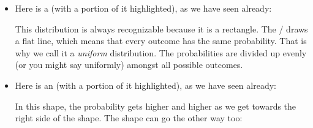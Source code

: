 \documentclass[../../../main.tex]{subfiles}
\begin{document}
\begin{itemize}

  \item Here is a  (with a portion of it highlighted), as we have seen already:
  
    \begin{center}
    \end{center}
    
    This distribution is always recognizable because it is a rectangle. The \PDFtext/ draws a flat line, which means that every outcome has the same probability. That is why we call it a \emph{uniform} distribution. The probabilities are divided up evenly (or you might say uniformly) amongst all possible outcomes.
  
  \item Here is an  (with a portion of it highlighted), as we have seen already:
  
    \begin{center}
    \end{center}
  
    In this shape, the probability gets higher and higher as we get towards the right side of the shape. The shape can go the other way too:
    

\end{itemize}
\end{document}

